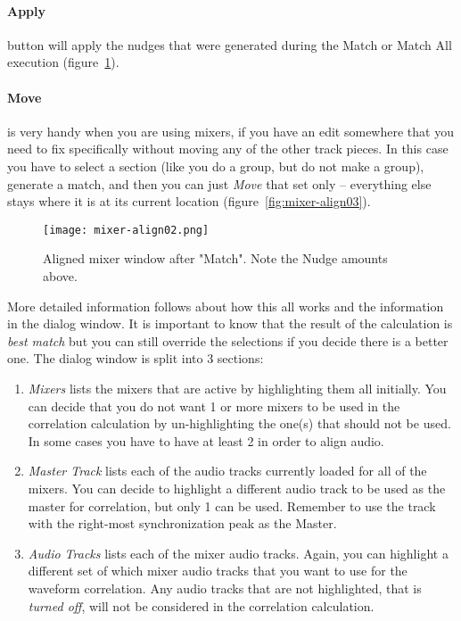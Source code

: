 \paragraph{Apply} button will apply the nudges that were generated during the Match or Match All execution (figure~\ref{fig:mixer-align02}).

\paragraph{Move} is very handy when you are using mixers, if you have an edit somewhere that you need to fix specifically without moving any of the other track pieces. In this case you have to select a section (like you do a group, but do not make a group), generate a match, and then you can just \textit{Move} that set only -- everything else stays where it is at its current location (figure~\ref{fig:mixer-align03}).

\begin{figure}[htpb]
    \centering
    \texttt{[image: mixer-align02.png]}
    \caption{Aligned mixer window after "Match". Note the Nudge amounts above.}
    \label{fig:mixer-align02}
\end{figure}

More detailed information follows about how this all works and the information in the dialog window.  It is important to know that the result of the calculation is \textit{best match} but you can still override the selections if you decide there is a better one.  The dialog window is split into 3 sections:

\begin{enumerate}
    \item \textit{Mixers} lists the mixers that are active by highlighting them all initially. You can decide that you do
    not want 1 or more mixers to be used in the correlation calculation by un-highlighting the one(s) that should not be used. In some cases you have to have at least 2 in order to align audio.
    \item \textit{Master Track} lists each of the audio tracks currently loaded for all of the mixers. You can decide to highlight a different audio track to be used as the master for correlation, but only 1 can be used. Remember to use the track with the right-most synchronization peak as the Master.
    \item \textit{Audio Tracks} lists each of the mixer audio tracks.  Again, you can highlight a different set of which
    mixer audio tracks that you want to use for the waveform correlation.  Any audio tracks that are not
    highlighted, that is \textit{turned off}, will not be considered in the correlation calculation.
\end{enumerate}

